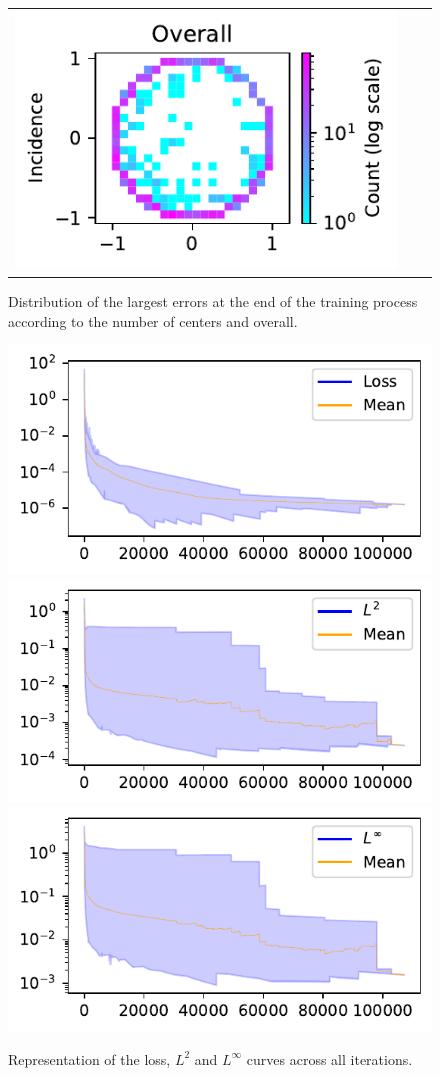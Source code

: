\documentclass[12pt]{report} %
\begin{document}
\begin{figure}[h]
\begin{tabular}{ccc}
    \includegraphics[width=.4\textwidth]{imagenes/experiments/2d/pde_parabola/distribution_of_errors_L_inf_end.pdf}
  \end{tabular}
  \caption{Distribution of the largest errors at the end of the training process according to the number of centers and overall.}
  \label{fig:2d-pde-results-largest-errors}
\end{figure}


\begin{figure}[h]
  \includegraphics[width=.7\textwidth]{imagenes/experiments/2d/pde_parabola/Loss_curves_semilogy_all.pdf}
  \includegraphics[width=.7\textwidth]{imagenes/experiments/2d/pde_parabola/L2_curves_semilogy_all.pdf}
  \includegraphics[width=.7\textwidth]{imagenes/experiments/2d/pde_parabola/Linf_curves_semilogy_all.pdf}
  \caption{Representation of the loss, $L^2$ and $L^\infty$ curves across all iterations.}
  \label{fig:2d-pde-results-last-iterations}
\end{figure}
\end{document}
